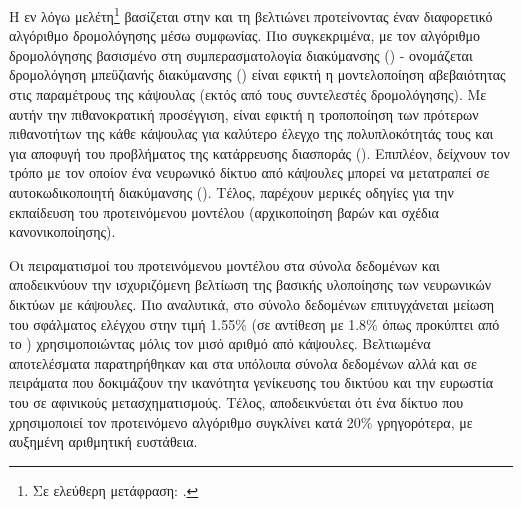 Η εν λόγω μελέτη\footnote{Σε ελεύθερη μετάφραση: .}\cite{De_Sousa_Ribeiro_Leontidis_Kollias_2020_Capsule_Routing} βασίζεται στην \cite{hinton2018matrix} και τη βελτιώνει προτείνοντας έναν διαφορετικό αλγόριθμο δρομολόγησης μέσω συμφωνίας. Πιο συγκεκριμένα, με τον αλγόριθμο δρομολόγησης βασισμένο στη συμπερασματολογία διακύμανσης () - ονομάζεται δρομολόγηση μπεϋζιανής διακύμανσης () είναι εφικτή η μοντελοποίηση αβεβαιότητας στις παραμέτρους της κάψουλας (εκτός από τους συντελεστές δρομολόγησης). Με αυτήν την πιθανοκρατική προσέγγιση, είναι εφικτή η τροποποίηση των πρότερων πιθανοτήτων της κάθε κάψουλας για καλύτερο έλεγχο της πολυπλοκότητάς τους και για αποφυγή του προβλήματος της κατάρρευσης διασποράς (). Επιπλέον, δείχνουν τον τρόπο με τον οποίον ένα νευρωνικό δίκτυο από κάψουλες μπορεί να μετατραπεί σε αυτο\textendash κωδικοποιητή διακύμανσης (). Τέλος, παρέχουν μερικές οδηγίες για την εκπαίδευση του προτεινόμενου μοντέλου (αρχικοποίηση βαρών και σχέδια κανονικοποίησης). \par

Οι πειραματισμοί του προτεινόμενου μοντέλου στα σύνολα δεδομένων  και  αποδεικνύουν την ισχυριζόμενη βελτίωση της βασικής υλοποίησης των νευρωνικών δικτύων με κάψουλες. Πιο αναλυτικά, στο σύνολο δεδομένων \cite{lecun2004learning} επιτυγχάνεται μείωση του σφάλματος ελέγχου στην τιμή 1.55\% (σε αντίθεση με 1.8\% όπως προκύπτει από το \cite{hinton2018matrix}) χρησιμοποιώντας μόλις τον μισό αριθμό από κάψουλες. Βελτιωμένα αποτελέσματα παρατηρήθηκαν και στα υπόλοιπα σύνολα δεδομένων αλλά και σε πειράματα που δοκιμάζουν την ικανότητα γενίκευσης του δικτύου και την ευρωστία του σε αφινικούς μετασχηματισμούς. Τέλος, αποδεικνύεται ότι ένα δίκτυο που χρησιμοποιεί τον προτεινόμενο αλγόριθμο συγκλίνει κατά 20\% γρηγορότερα, με αυξημένη αριθμητική ευστάθεια.

